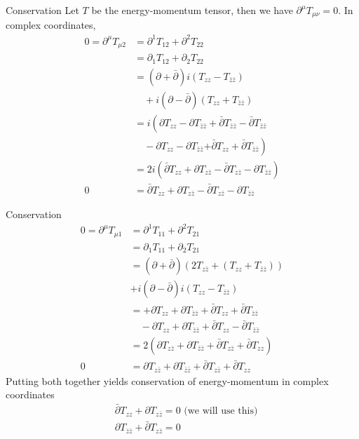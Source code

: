 \documentclass{beamer}
\begin{document}
\begin{frame}{Conservation}
    Let $T$ be the energy-momentum tensor, then we have $\partial^\mu T_{\mu \nu} = 0$. In complex coordinates,
    \begin{align}
0 = \partial^\mu T_{\mu 2}& = \partial^{1} T_{12}+\partial^2 T_{22} \\
& = \partial_{1} T_{12}+\partial_2 T_{22} \\
& =(\partial+\bar{\partial}) i\left(T_{z z}-T_{\bar{z} \bar{z}}\right) \\
& \quad +i(\partial-\bar{\partial})\left(T_{z z}+T_{\bar{z} \bar{z}}\right) \\
& =i\left(\partial T_{z z}-\partial T_{\bar{z} \bar{z}}+\bar{\partial}T_{\bar{z}\bar z}-\bar{\partial} T_{\bar{z} \bar{z}} \right. \\
& \quad -\partial T_{z {z}}-\partial T_{\bar{z} \bar{z}} \left. +\bar{\partial} T_{z z}+\bar{\partial} T_{\bar{z} \bar{z}} \right)\\
& =2 i\left(\bar{\partial} T_{z z}+\partial T_{z \bar{z}}-\bar{\partial} T_{z \bar{z}}-\partial T_{\bar{z} \bar{z}}\right) \\
0 & = \bar{\partial} T_{z z}+\partial T_{z \bar{z}}-\bar{\partial} T_{z \bar{z}}-\partial T_{\bar{z} \bar{z}}
\end{align}
\end{frame}
\begin{frame}{Conservation}
    \begin{align}
    0 = \partial^\mu T_{\mu 1} &=\partial^1 T_{11} + \partial^2 T_{21} \\
&= \partial_1 T_{11} + \partial_2 T_{21}\\
&=(\partial + \bar \partial) (2 T_{z\bar z} + (T_{zz} + T_{\bar z \bar z }))\\
&+i(\partial - \bar \partial) i(T_{zz} - T_{\bar z \bar z })\\
&=+ \partial T_{zz} + \partial T_{\bar z \bar z} + \bar \partial T_{zz} + \bar \partial T_{\bar z \bar z}\\
&\quad -\partial T_{zz}+\partial T_{\bar z \bar z}+\bar \partial T_{zz}-\bar \partial T_{\bar z \bar z}\\
&=2\left( \partial T_{z\bar z} + \partial T_{\bar z \bar z} + \bar \partial T_{z \bar z} + \bar \partial T_{zz} \right)\\
0&=\partial T_{z\bar z} + \partial T_{\bar z \bar z} + \bar \partial T_{z \bar z} + \bar \partial T_{zz}
    \end{align}
    Putting both together yields conservation of energy-momentum in complex coordinates
    \begin{align}
& \bar{\partial} T_{z z}+\partial T_{z \bar{z}}=0 \text{ (we will use this)}\\
& \partial T_{\bar{z} \bar{z}}+\bar \partial {T}_{{z} \bar{z}}=0 
    \end{align}
\end{frame}
\end{document}
